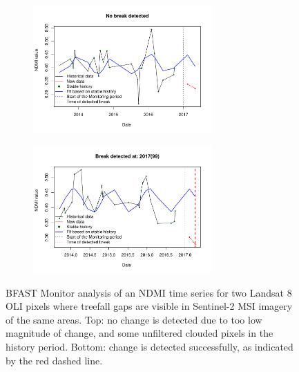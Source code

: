 \documentclass[a4paper,12pt]{scrbook}
\begin{document}
\begin{figure}
  \begin{subfigure}{\textwidth}
    \centering
    \includegraphics[width=0.75\textwidth]{thesis-figures/09-guyana17-landsat-ndmi-undetected-c}
  \end{subfigure}
  \begin{subfigure}{\textwidth}
    \centering
    \includegraphics[width=0.75\textwidth]{thesis-figures/10-guyana17-landsat-ndmi-detected-b}
  \end{subfigure}
  
  \caption{\ac{BFAST} Monitor analysis of an \ac{NDMI} time series for two Landsat 8 \ac{OLI} pixels where treefall gaps are visible in Sentinel-2 \ac{MSI} imagery of the same areas. Top: no change is detected due to too low magnitude of change, and some unfiltered clouded pixels in the history period. Bottom: change is detected successfully, as indicated by the red dashed line.}
  \label{fig-guyana17-landsat-ndmi}
\end{figure}

\end{document}
